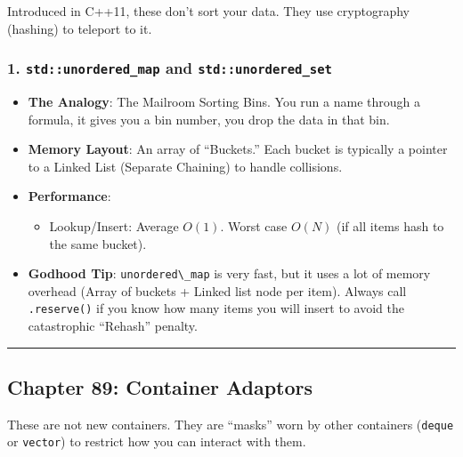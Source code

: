 Introduced in C++11, these don't sort your data. They use cryptography
(hashing) to teleport to it.

\hypertarget{stdunordered_map-and-stdunordered_set}{%
\subsubsection{\texorpdfstring{1. \texttt{std::unordered\_map} and
\texttt{std::unordered\_set}}{1. std::unordered\_map and std::unordered\_set}}\label{stdunordered_map-and-stdunordered_set}}

\begin{itemize}
\tightlist
\item
  \textbf{The Analogy}: The Mailroom Sorting Bins. You run a name
  through a formula, it gives you a bin number, you drop the data in
  that bin.
\item
  \textbf{Memory Layout}: An array of ``Buckets.'' Each bucket is
  typically a pointer to a Linked List (Separate Chaining) to handle
  collisions.
\item
  \textbf{Performance}:

  \begin{itemize}
  \tightlist
  \item
    Lookup/Insert: Average \(O(1)\). Worst case \(O(N)\) (if all items
    hash to the same bucket).
  \end{itemize}
\item
  \textbf{Godhood Tip}: \passthrough{\lstinline!unordered\_map!} is very
  fast, but it uses a lot of memory overhead (Array of buckets + Linked
  list node per item). Always call \passthrough{\lstinline!.reserve()!}
  if you know how many items you will insert to avoid the catastrophic
  ``Rehash'' penalty.
\end{itemize}

\begin{center}\rule{0.5\linewidth}{0.5pt}\end{center}

\hypertarget{chapter-89-container-adaptors}{%
\subsection{Chapter 89: Container
Adaptors}\label{chapter-89-container-adaptors}}

These are not new containers. They are ``masks'' worn by other
containers (\passthrough{\lstinline!deque!} or
\passthrough{\lstinline!vector!}) to restrict how you can interact with
them.

